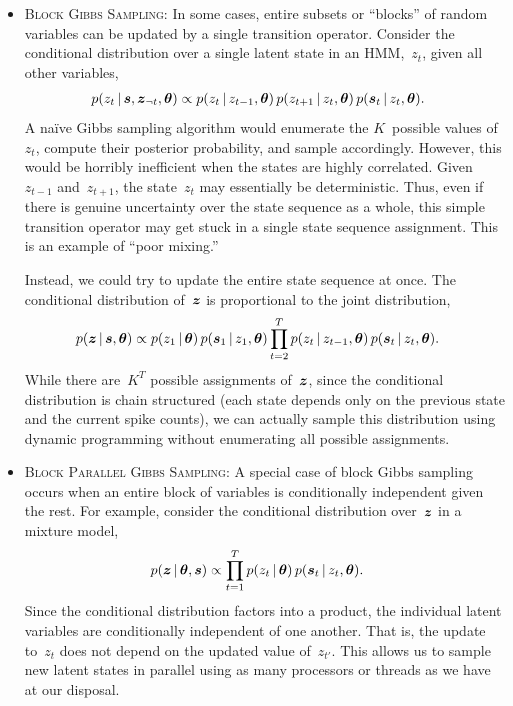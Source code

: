 \begin{itemize}
\item \textsc{Block Gibbs Sampling}:
  In some cases, entire subsets or ``blocks'' of random variables can 
  be updated by a single transition operator. Consider the conditional
  distribution over a single latent state in an HMM,~$z_t$, given all other
  variables,  
  \begin{align*}
    p(z_t \,|\, \boldsymbol{s}, \boldsymbol{z}_{\neg t}, \boldsymbol{\theta}) 
    &\propto p(z_t \,|\, z_{t-1}, \boldsymbol{\theta}) \,
    p(z_{t+1} \,|\, z_t, \boldsymbol{\theta}) \,
    p(\boldsymbol{s}_t \,|\, z_t, \boldsymbol{\theta}).
  \end{align*}
  A na\"ive Gibbs sampling algorithm would enumerate the $K$~possible
  values of~$z_t$, compute their posterior probability, and sample
  accordingly. However, this would be horribly inefficient when the
  states are highly correlated. Given~$z_{t-1}$ and~$z_{t+1}$, the
  state~$z_t$ may essentially be deterministic. Thus, even if there is
  genuine uncertainty over the state sequence as a whole, this simple
  transition operator may get stuck in a single state sequence
  assignment.  This is an example of ``poor mixing.''

  Instead, we could try to update the entire state sequence at once. 
  The conditional distribution of~$\boldsymbol{z}$ is proportional to the joint 
  distribution,
  \begin{align*}
    p(\boldsymbol{z} \,|\, \boldsymbol{s}, \boldsymbol{\theta}) 
    &\propto p(z_1 \,|\, \boldsymbol{\theta}) \, p(\boldsymbol{s}_1 \,|\, z_1, \boldsymbol{\theta})
      \prod_{t=2}^T p(z_t \,|\, z_{t-1}, \boldsymbol{\theta}) \, 
      p(\boldsymbol{s}_t \,|\, z_t, \boldsymbol{\theta}).
  \end{align*}
  While there are~$K^T$ possible assignments of~$\boldsymbol{z}$, since the
  conditional distribution is chain structured (each state depends
  only on the previous state and the current spike counts), we can
  actually sample this distribution using dynamic programming
  without enumerating all possible assignments.
  
\item \textsc{Block Parallel Gibbs Sampling}:
  A special case of block Gibbs sampling occurs when an entire block 
  of variables is conditionally independent given the rest. For example,
  consider the conditional distribution over~$\boldsymbol{z}$ in a mixture model,
  \begin{align*}
    p(\boldsymbol{z} \,|\, \boldsymbol{\theta}, \boldsymbol{s}) 
    &\propto \prod_{t=1}^T p(z_t \,|\, \boldsymbol{\theta}) \,
      p(\boldsymbol{s}_t \,|\, z_t, \boldsymbol{\theta}).
  \end{align*}
  Since the conditional distribution factors into a product, the individual
  latent variables are conditionally independent of one another. That is, the 
  update to~$z_t$ does not depend on the updated value of~$z_{t'}$. This 
  allows us to sample new latent states in parallel using as many processors
  or threads as we have at our disposal.


\end{itemize}
